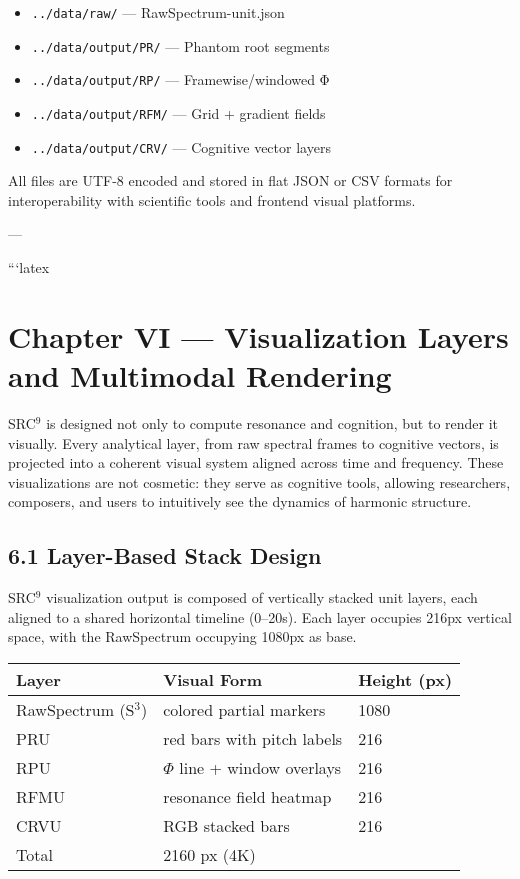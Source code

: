 \begin{itemize}
    \item \texttt{../data/raw/} — RawSpectrum-unit.json
    \item \texttt{../data/output/PR/} — Phantom root segments
    \item \texttt{../data/output/RP/} — Framewise/windowed Φ
    \item \texttt{../data/output/RFM/} — Grid + gradient fields
    \item \texttt{../data/output/CRV/} — Cognitive vector layers
\end{itemize}

All files are UTF-8 encoded and stored in flat JSON or CSV formats for interoperability with scientific tools and frontend visual platforms.


---

```latex
\section*{Chapter VI — Visualization Layers and Multimodal Rendering}

SRC$^{9}$ is designed not only to compute resonance and cognition, but to render it visually. Every analytical layer, from raw spectral frames to cognitive vectors, is projected into a coherent visual system aligned across time and frequency. These visualizations are not cosmetic: they serve as cognitive tools, allowing researchers, composers, and users to intuitively see the dynamics of harmonic structure.

\subsection*{6.1 Layer-Based Stack Design}

SRC$^{9}$ visualization output is composed of vertically stacked unit layers, each aligned to a shared horizontal timeline (0–20s). Each layer occupies 216px vertical space, with the RawSpectrum occupying 1080px as base.

\begin{center}
\begin{tabular}{|l|l|l|}
\hline
\textbf{Layer} & \textbf{Visual Form} & \textbf{Height (px)} \\
\hline
RawSpectrum (S$^3$) & colored partial markers & 1080 \\
PRU & red bars with pitch labels & 216 \\
RPU & $\Phi$ line + window overlays & 216 \\
RFMU & resonance field heatmap & 216 \\
CRVU & RGB stacked bars & 216 \\
\hline
Total & 2160 px (4K) & \\
\hline
\end{tabular}
\end{center}

